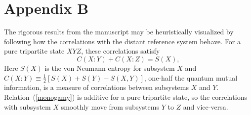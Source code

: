 \documentclass[twocolumn,aps,prl,amsmath,amssymb,floatfix]{revtex4}
\begin{document}
\section{Appendix B}
\label{heuristic}

The rigorous results from the manuscript may be heuristically visualized
by following how the correlations with the distant reference system
behave. For a pure tripartite state $XYZ$, these correlations satisfy
\begin{equation}
C(X\!:\!Y)+C(X\!:\!Z) = S(X), \label{monogamy}
\end{equation}
Here $S(X)$ is the von Neumann entropy for subsystem $X$ and
$C(X\!:\!Y)\equiv\frac{1}{2}[S(X)+S(Y)-S(X,Y)]$, one-half the quantum
mutual information, is a measure of correlations between subsystems
$X$ and $Y$. Relation~(\ref{monogamy}) is additive for a pure
tripartite state, so the correlations with subsystem $X$ smoothly
move from subsystems $Y$ to $Z$ and vice-versa.
\end{document}
